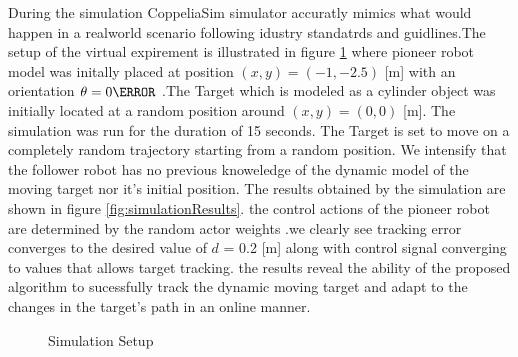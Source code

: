 \documentclass[conference]{IEEEtran}
\begin{document}
 
  During the simulation CoppeliaSim simulator accuratly mimics what would happen in a realworld scenario following idustry standatrds and guidlines.The setup of the virtual expirement is illustrated  in figure \ref{fig:CoppeliaSim Scene} where pioneer robot model was initally placed at position $(x,y) = (-1,-2.5) $ [m] with an orientation $\theta = 0 \degree$ .The Target which is modeled as a cylinder object was initially located at a random position around  $(x,y) = (0,0)$ [m]. The simulation was run for the duration of 15 seconds. 
  The Target is set to move on a completely random trajectory starting from a random position. We intensify that the follower robot has no previous knoweledge of the dynamic model of the moving target nor it's initial position. The results obtained by the simulation are shown in figure \ref{fig:simulationResults}. the control actions of the pioneer robot are determined by the random actor weights .we clearly see tracking error converges to the desired value of $d$ = 0.2 [m] along with control signal converging to values that allows target tracking. the results reveal the ability of the proposed algorithm to sucessfully track the dynamic moving target and adapt to the changes in the target's path in an online manner.      
\begin{figure}
   \centering
   \caption{Simulation Setup}
   \label{fig:CoppeliaSim Scene}
 \end{figure}  
    
\end{document}
